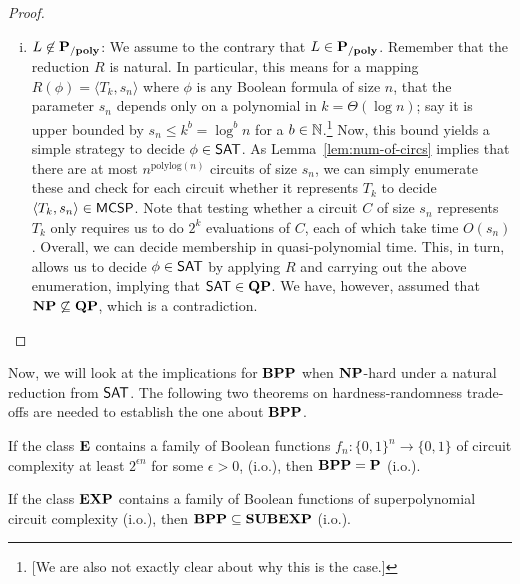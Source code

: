 \documentclass[11pt]{article}
\begin{document}
\begin{proof}
\begin{itemize}
\begin{enumerate}[(i)]
        \item $L \not\in \mathbf{P_{/poly}}$:
          We assume to the contrary that $L \in \mathbf{P_{/poly}}$.
          Remember that the reduction $R$ is natural. In particular, this means
          for a mapping $R(\phi) = \langle T_k, s_n \rangle$ where
          $\phi$ is any Boolean formula of size $n$, that
          the parameter $s_n$ depends only on a polynomial in
          $k = \Theta(\log n)$; say it is
          upper bounded by
          $s_n \le k^b = \log^b n$ %
          for a $b \in {\mathbb{N}}$.\footnote{
            [We are also not exactly clear about why this is the case.]
          }
          Now, this bound yields a simple strategy to decide $\phi \in \mathsf{SAT}$.
          As Lemma~\ref{lem:num-of-circs} implies that there are at
          most $n^{\mathrm{polylog}(n)}$ circuits of size $s_n$,
          we can simply enumerate these and check for each circuit whether
          it represents $T_k$ to decide
          $\langle T_k , s_n \rangle \in \mathsf{MCSP}$.
          Note that testing whether a circuit $C$ of size $s_n$ represents
          $T_k$ only requires us to do $2^k$ evaluations of $C$, each of which
          take time $O(s_n)$.
          Overall, we can decide membership in quasi-polynomial time.
          This, in turn, allows us to decide $\phi \in \mathsf{SAT}$ by applying $R$
          and carrying out the above enumeration,
          implying that $\mathsf{SAT} \in \mathbf{QP}$.
          We have, however, assumed that $\mathbf{NP} \not\subseteq \mathbf{QP}$, which
          is a contradiction.
      \end{enumerate}
	\end{itemize}
\end{proof}

Now, we will look at the implications for $\mathbf{BPP}$ when $\mathbf{NP}$-hard under a natural reduction from $\mathsf{SAT}$. The following two theorems on hardness-randomness trade-offs are needed to establish the one about $\mathbf{BPP}$.

\begin{theorem}
	If the class $\mathbf{E}$ contains a family of Boolean functions $f_n: \{0, 1\}^n \rightarrow \{0, 1\}$ of circuit complexity at least $2^{\epsilon n}$ for some $\epsilon > 0$, (i.o.), then $\mathbf{BPP} = \mathbf{P}$ (i.o.).
\end{theorem}

\begin{theorem}
	If the class $\mathbf{EXP}$ contains a family of Boolean functions of superpolynomial circuit complexity (i.o.), then $\mathbf{BPP} \subseteq \mathbf{SUBEXP}$ (i.o.).
\end{theorem}
\end{document}
